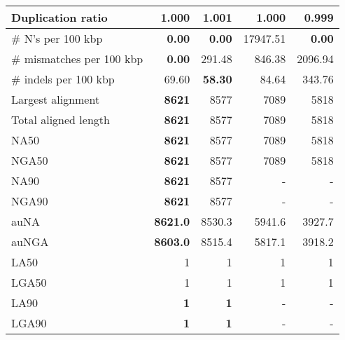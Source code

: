 \documentclass[12pt,a4paper]{article}
\begin{document}
\begin{table}[ht]
\begin{center}
\begin{tabular}{|l*{4}{|r}|}
Duplication ratio & 1.000 & 1.001 & 1.000 & {\bf 0.999} \\ \hline
\# N's per 100 kbp & {\bf 0.00} & {\bf 0.00} & 17947.51 & {\bf 0.00} \\ \hline
\# mismatches per 100 kbp & {\bf 0.00} & 291.48 & 846.38 & 2096.94 \\ \hline
\# indels per 100 kbp & 69.60 & {\bf 58.30} & 84.64 & 343.76 \\ \hline
Largest alignment & {\bf 8621} & 8577 & 7089 & 5818 \\ \hline
Total aligned length & {\bf 8621} & 8577 & 7089 & 5818 \\ \hline
NA50 & {\bf 8621} & 8577 & 7089 & 5818 \\ \hline
NGA50 & {\bf 8621} & 8577 & 7089 & 5818 \\ \hline
NA90 & {\bf 8621} & 8577 & - & - \\ \hline
NGA90 & {\bf 8621} & 8577 & - & - \\ \hline
auNA & {\bf 8621.0} & 8530.3 & 5941.6 & 3927.7 \\ \hline
auNGA & {\bf 8603.0} & 8515.4 & 5817.1 & 3918.2 \\ \hline
LA50 & 1 & 1 & 1 & 1 \\ \hline
LGA50 & 1 & 1 & 1 & 1 \\ \hline
LA90 & {\bf 1} & {\bf 1} & - & - \\ \hline
LGA90 & {\bf 1} & {\bf 1} & - & - \\ \hline
\end{tabular}
\end{center}
\end{table}
\end{document}

